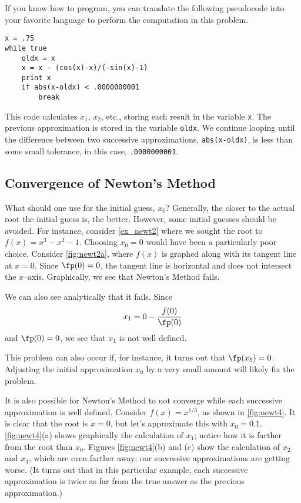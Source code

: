 If you know how to program, you can translate the following pseudocode into your favorite language to perform the computation in this problem.
\begin{center}
\begin{verbatim}
x = .75
while true
    oldx = x
    x = x - (cos(x)-x)/(-sin(x)-1)
    print x
    if abs(x-oldx) < .0000000001
        break
\end{verbatim}
\end{center}


This code calculates $x_1$, $x_2$, etc., storing each result in the variable \texttt{x}.  The previous approximation is stored in the variable \texttt{oldx}.  We continue looping until the difference between two successive approximations, \texttt{abs(x-oldx)}, is less than some small tolerance, in this case,
\texttt{.0000000001}.

\subsection*{Convergence of Newton's Method}

What should one use for the initial guess, $x_0$?  Generally, the closer to the actual root the initial guess is, the better.  However, some initial guesses should be avoided.  For instance, consider \autoref{ex_newt2} where we sought the root to $f(x) = x^3-x^2-1$.  Choosing  $x_0=0$ would have been a particularly poor choice. Consider \autoref{fig:newt2a}, where $f(x)$ is graphed along with its tangent line at $x=0$. Since $\fp(0)=0$, the tangent line is horizontal and does not intersect the $x$--axis. Graphically, we see that Newton's Method fails.

We can also see analytically that it fails. Since $$x_1 = 0 -\frac{f(0)}{\fp(0)}$$ and $\fp(0)=0$, we see that $x_1$ is not well defined.  

This problem can also occur if, for instance, it turns out that $\fp(x_5)=0$. Adjusting the initial approximation $x_0$ by a very small amount will likely fix the problem.

It is also possible for Newton's Method to not converge while each successive approximation is well defined. Consider $f(x) = x^{1/3}$, as shown in \autoref{fig:newt4}. It is clear that the root is $x=0$, but let's approximate this with $x_0=0.1$. \autoref{fig:newt4}(a) shows graphically the calculation of $x_1$; notice how it is farther from the root than $x_0$. Figures \ref{fig:newt4}(b) and (c) show the calculation of $x_2$ and $x_3$, which are even farther away; our successive approximations are getting worse. (It turns out that in this particular example, each successive approximation is twice as far from the true answer as the previous approximation.)


